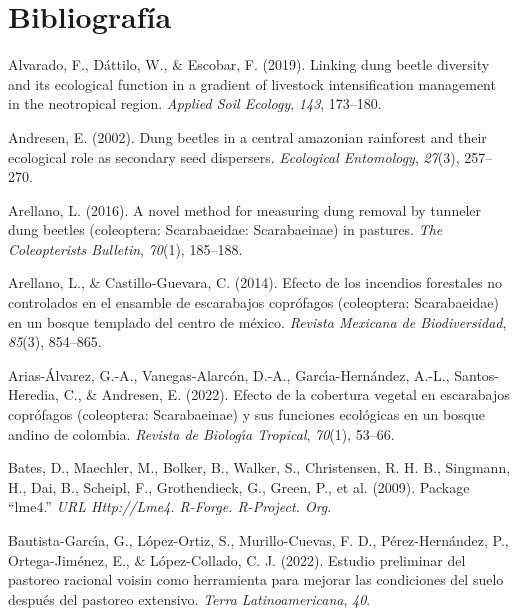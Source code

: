 \documentclass[
  11pt,
  a4paper]{book}
\newlength{\cslhangindent}
\newlength{\cslentryspacingunit} %
\newenvironment{CSLReferences}[2] %
 {%
  \setlength{\parindent}{0pt}
  \ifodd #1
  \let\oldpar\par
  \def\par{\hangindent=\cslhangindent\oldpar}
  \fi
  \setlength{\parskip}{#2\cslentryspacingunit}
 }%
 {}
\begin{document}
\hypertarget{bibliografuxeda}{%
\chapter*{Bibliografía}\label{bibliografuxeda}}

\hypertarget{refs}{}
\begin{CSLReferences}{1}{0}
\leavevmode{}%
Alvarado, F., Dáttilo, W., \& Escobar, F. (2019). Linking dung beetle diversity and its ecological function in a gradient of livestock intensification management in the neotropical region. \emph{Applied Soil Ecology}, \emph{143}, 173--180.

\leavevmode{}%
Andresen, E. (2002). Dung beetles in a central amazonian rainforest and their ecological role as secondary seed dispersers. \emph{Ecological Entomology}, \emph{27}(3), 257--270.

\leavevmode{}%
Arellano, L. (2016). A novel method for measuring dung removal by tunneler dung beetles (coleoptera: Scarabaeidae: Scarabaeinae) in pastures. \emph{The Coleopterists Bulletin}, \emph{70}(1), 185--188.

\leavevmode{}%
Arellano, L., \& Castillo-Guevara, C. (2014). Efecto de los incendios forestales no controlados en el ensamble de escarabajos copr{ó}fagos (coleoptera: Scarabaeidae) en un bosque templado del centro de m{é}xico. \emph{Revista Mexicana de Biodiversidad}, \emph{85}(3), 854--865.

\leavevmode{}%
Arias-Álvarez, G.-A., Vanegas-Alarcón, D.-A., Garcı́a-Hernández, A.-L., Santos-Heredia, C., \& Andresen, E. (2022). Efecto de la cobertura vegetal en escarabajos copr{ó}fagos (coleoptera: Scarabaeinae) y sus funciones ecol{ó}gicas en un bosque andino de colombia. \emph{Revista de Biolog{ı́}a Tropical}, \emph{70}(1), 53--66.

\leavevmode{}%
Bates, D., Maechler, M., Bolker, B., Walker, S., Christensen, R. H. B., Singmann, H., Dai, B., Scheipl, F., Grothendieck, G., Green, P., et al. (2009). Package {``lme4.''} \emph{URL Http://Lme4. R-Forge. R-Project. Org}.

\leavevmode{}%
Bautista-Garcı́a, G., López-Ortiz, S., Murillo-Cuevas, F. D., Pérez-Hernández, P., Ortega-Jiménez, E., \& López-Collado, C. J. (2022). Estudio preliminar del pastoreo racional voisin como herramienta para mejorar las condiciones del suelo despu{é}s del pastoreo extensivo. \emph{Terra Latinoamericana}, \emph{40}.


\end{CSLReferences}
\end{document}

